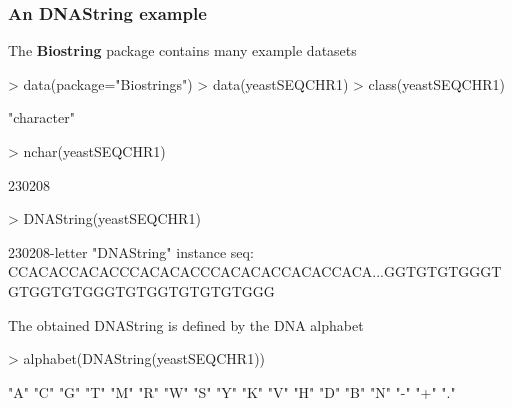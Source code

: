 \documentclass{beamer}
\begin{document}
\begin{frame}[fragile]
\frametitle{An DNAString example}
  \bit
      \item The \textbf{Biostring} package contains many example datasets
            \begin{uncoverenv}
\begin{Schunk}
\begin{Sinput}
> data(package="Biostrings")
> data(yeastSEQCHR1)
> class(yeastSEQCHR1)
\end{Sinput}
\begin{Soutput}
[1] "character"
\end{Soutput}
\begin{Sinput}
> nchar(yeastSEQCHR1)
\end{Sinput}
\begin{Soutput}
[1] 230208
\end{Soutput}
\begin{Sinput}
> DNAString(yeastSEQCHR1)
\end{Sinput}
\begin{Soutput}
  230208-letter "DNAString" instance
seq: CCACACCACACCCACACACCCACACACCACACCACA...GGTGTGTGGGTGTGGTGTGGGTGTGGTGTGTGTGGG
\end{Soutput}
\end{Schunk}
            \end{uncoverenv}
      \item The obtained DNAString is defined by the DNA alphabet
            \begin{uncoverenv}
\begin{Schunk}
\begin{Sinput}
> alphabet(DNAString(yeastSEQCHR1))
\end{Sinput}
\begin{Soutput}
 [1] "A" "C" "G" "T" "M" "R" "W" "S" "Y" "K" "V" "H" "D" "B" "N" "-" "+" "."
\end{Soutput}
\end{Schunk}
            \end{uncoverenv}
  \eit
\end{frame}

\end{document}
